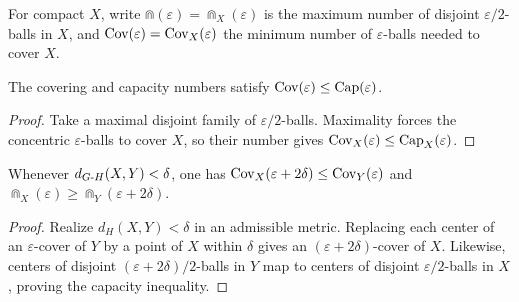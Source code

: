 \begin{definition}
  \label{def:pet-ch11-capacity-covering-functions}

  For compact $X$, write
  $\Cap(\varepsilon)=\Cap_X(\varepsilon)$ is the maximum number of disjoint
  $\varepsilon/2$-balls in $X$, and $\operatorname{Cov}(\varepsilon)=\operatorname{Cov}_X(\varepsilon)$
  the minimum number of $\varepsilon$-balls needed to cover $X$.
\end{definition}

\begin{lemma}
  \label{lem:pet-ch11-cov-le-cap}

  The covering and capacity numbers satisfy
  $\operatorname{Cov}(\varepsilon)\le\operatorname{Cap}(\varepsilon)$.
\end{lemma}
\begin{proof}
  \sketch
  Take a maximal disjoint family of \(\varepsilon/2\)-balls. Maximality forces
  the concentric \(\varepsilon\)-balls to cover \(X\), so their number gives
  \(\operatorname{Cov}_X(\varepsilon)\le\operatorname{Cap}_X(\varepsilon)\).
\end{proof}


\begin{lemma}
  \label{lem:pet-ch11-gh-close-cov-cap-comparison}

  Whenever $d_{G\text{-}H}(X,Y)<\delta$, one has
  $\operatorname{Cov}_X(\varepsilon+2\delta)\le\operatorname{Cov}_Y(\varepsilon)$ and
  $\Cap_X(\varepsilon)\ge\Cap_Y(\varepsilon+2\delta)$.
\end{lemma}
\begin{proof}
  \sketch
  Realize \(d_H(X,Y)<\delta\) in an admissible metric. Replacing each center
  of an \(\varepsilon\)-cover of \(Y\) by a point of \(X\) within \(\delta\)
  gives an \((\varepsilon+2\delta)\)-cover of \(X\). Likewise, centers of
  disjoint \((\varepsilon+2\delta)/2\)-balls in \(Y\) map to centers of
  disjoint \(\varepsilon/2\)-balls in \(X\), proving the capacity inequality.
\end{proof}


